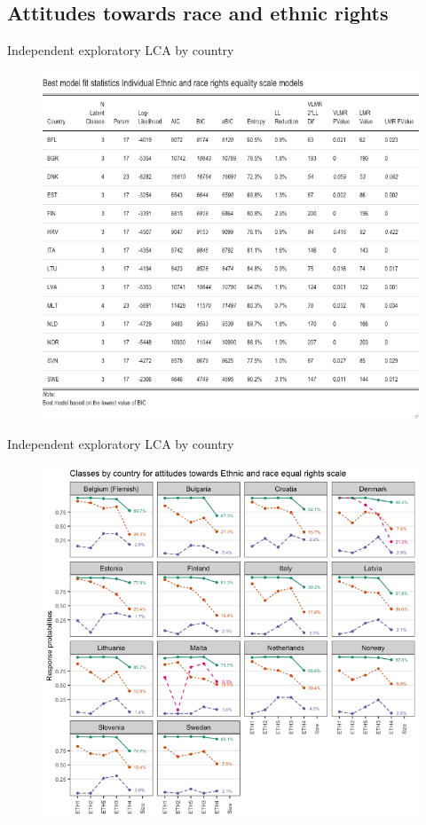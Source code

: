 \documentclass[11pt,t]{beamer}
\begin{document}
\subsection{Attitudes towards race and ethnic rights}
\begin{frame}[c,plain]{Independent exploratory LCA by country}
\vspace{-11pt}
	
\begin{figure}
	\centering
	\includegraphics[height=0.7\textwidth]{graphics/countrymodelethnic.png}
\end{figure}	
\end{frame} 

\begin{frame}[c,plain]{Independent exploratory LCA by country}
\vspace{-11pt}
	
\begin{figure}
	\centering
	\includegraphics[height=0.7\textwidth]{graphics/ByCntryEthnic.png}
\end{figure}	
\end{frame} 
\end{document}
